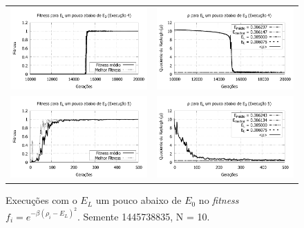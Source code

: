 \begin{figure}[p]
\begin{tabular}{@{}cc@{}}
		\includegraphics[width=.40\textwidth]{figs/resultados/variandoEL/T2E4_fitness-extendido.pdf} &
    \includegraphics[width=.40\textwidth]{figs/resultados/variandoEL/T2E4_rho_extendido.pdf}   \\
		
		\includegraphics[width=.40\textwidth]{figs/resultados/variandoEL/T2E5_fitness.pdf} &
    \includegraphics[width=.40\textwidth]{figs/resultados/variandoEL/T2E5_rho.pdf}

  \end{tabular}
  \caption{Execuções com o $E_L$ um pouco abaixo de $E_0$ no \textit{fitness} $f_i = e^{-\beta(\rho_i - E_L)^2}$. Semente 1445738835, N = 10.}
	\label{fig:variando_EL_pouco_abaixo}
	\end{figure}

